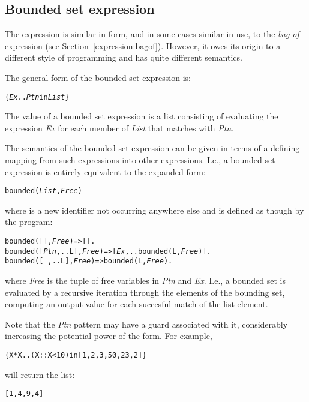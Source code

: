 \subsection{Bounded set expression}
\label{expression:bounded}

The  expression is similar in form, and in some cases similar in use, to the \emph{bag of} expression (see Section~\vref{expression:bagof}). However, it owes its origin to a different style of programming and has quite different semantics.

The general form of the bounded set expression is:
\begin{alltt}
\{ \emph{Ex} .. \emph{Ptn} in \emph{List} \}
\end{alltt}
The value of a bounded set expression is a list consisting of evaluating the expression \emph{Ex} for each member of \emph{List} that matches with \emph{Ptn}.

The semantics of the bounded set expression can be given in terms of a defining mapping from such expressions into other \go expressions. I.e., a bounded set expression is entirely equivalent to the expanded form:
\begin{alltt}
bounded(\emph{List},\emph{Free})
\end{alltt}
where  is a new identifier not occurring anywhere else and is defined as though by the program:
\begin{alltt}
bounded([],\emph{Free}) => [].
bounded([\emph{Ptn},..L],\emph{Free}) => [\emph{Ex},..bounded(L,\emph{Free})].
bounded([_,..L],\emph{Free}) => bounded(L,\emph{Free}).
\end{alltt}
where \emph{Free} is the tuple of free variables in \emph{Ptn} and \emph{Ex}. I.e., a bounded set is evaluated by a recursive iteration through the elements of the bounding set, computing an output value for each succesful match of the list element. 

Note that the \emph{Ptn} pattern may have a guard associated with it, considerably increasing the potential power of the form. For example, 
\begin{alltt}
\{ X*X .. (X::X<10) in [1,2,3,50,23,2] \}
\end{alltt}
will return the list:
\begin{alltt}
[1,4,9,4]
\end{alltt}

